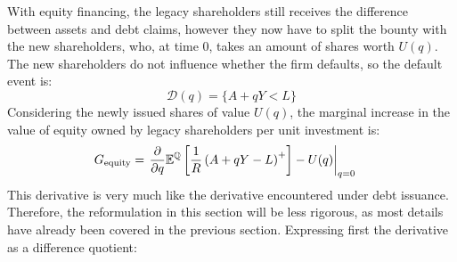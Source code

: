 \documentclass[../main.tex]{subfiles}
\begin{document}
        With equity financing, the legacy shareholders still receives the difference between assets and debt claims,
        however they now have to split the bounty with the new shareholders, 
        who, at time 0, takes an amount of shares worth $U(q)$. 
        The new shareholders do not influence whether the firm defaults, so the default event is:
            \begin{equation*}
                \mathcal{D}(q)
                = 
                \{
                    A + qY < L
                \}
            \end{equation*}
        Considering the newly issued shares of value $U(q)$,
        the marginal increase in the value of equity owned by legacy shareholders per unit investment is:
            \begin{align}
                G_{\text{equity}} &=
                    \left.
                    \frac{
                        \partial 
                    }{
                        \partial 
                        q
                    }
                    \mathbb{E}^{\mathbb{Q}}\left[
                        \frac{1}{R} 
                        \left(
                            A + qY - L
                        \right)^{+}
                    \right]
                    -
                    U(q) 
                    \right\rvert_{q=0} 
                    \nonumber
            \end{align}
        This derivative is very much like the derivative encountered under debt issuance.
        Therefore, the reformulation in this section will be less rigorous,
        as most details have already been covered in the previous section.
        Expressing first the derivative as a difference quotient:
\end{document}
